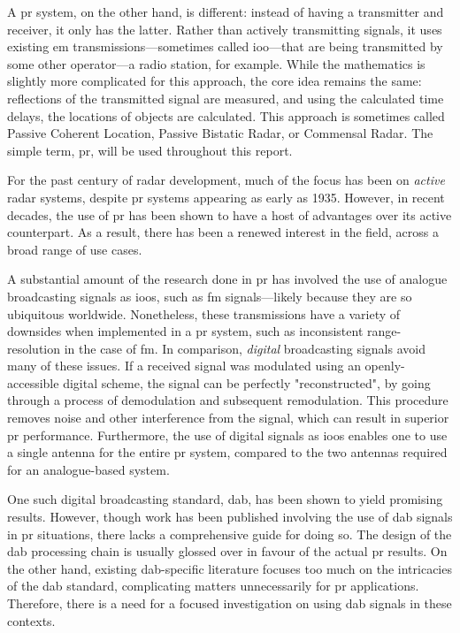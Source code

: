 \documentclass[class=report,11pt,crop=false]{standalone}
\begin{document}
A \gls{pr} system, on the other hand, is different: instead of having a transmitter and receiver, it only has the latter. Rather than actively transmitting signals, it uses existing \gls{em} transmissions---sometimes called \gls{ioo}---that are being transmitted by some other operator---a radio station, for example. While the mathematics is slightly more complicated for this approach, the core idea remains the same: reflections of the transmitted signal are measured, and using the calculated time delays, the locations of objects are calculated. This approach is sometimes called Passive Coherent Location, Passive Bistatic Radar, or Commensal Radar. The simple term, \gls{pr}, will be used throughout this report.

For the past century of radar development, much of the focus has been on \emph{active} radar systems, despite \gls{pr} systems appearing as early as 1935. However, in recent decades, the use of \gls{pr} has been shown to have a host of advantages over its active counterpart. As a result, there has been a renewed interest in the field, across a broad range of use cases.

A substantial amount of the research done in \gls{pr} has involved the use of analogue broadcasting signals as \gls{ioo}s, such as \gls{fm} signals---likely because they are so ubiquitous worldwide. Nonetheless, these transmissions have a variety of downsides when implemented in a \gls{pr} system, such as inconsistent range-resolution in the case of \gls{fm}. In comparison, \emph{digital} broadcasting signals avoid many of these issues. If a received signal was modulated using an openly-accessible digital scheme, the signal can be perfectly "reconstructed", by going through a process of demodulation and subsequent remodulation. This procedure removes noise and other interference from the signal, which can result in superior \gls{pr} performance. Furthermore, the use of digital signals as \gls{ioo}s enables one to use a single antenna for the entire \gls{pr} system, compared to the two antennas required for an analogue-based system.

One such digital broadcasting standard, \gls{dab}, has been shown to yield promising results.  However, though work has been published involving the use of \gls{dab} signals in \gls{pr} situations, there lacks a comprehensive guide for doing so. The design of the \gls{dab} processing chain is usually glossed over in favour of the actual \gls{pr} results. On the other hand, existing \gls{dab}-specific literature focuses too much on the intricacies of the \gls{dab} standard, complicating matters unnecessarily for \gls{pr} applications. Therefore, there is a need for a focused investigation on using \gls{dab} signals in these contexts.
\end{document}
